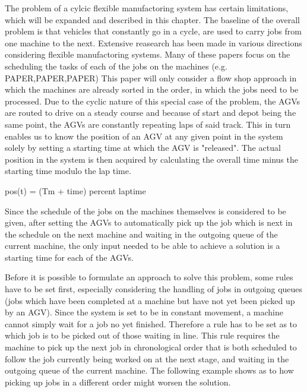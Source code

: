 
The problem of a cylcic flexible manufactoring system has certain limitations, which will be expanded and described in this chapter. The baseline
of the overall problem is that vehicles that constantly go in a cycle, are used to carry jobs from one machine to the next. Extensive reasearch 
has been made in various directions considering flexible manufactoring systems. Many of these papers focus on the scheduling the tasks of each of
the jobs on the machines (e.g. PAPER,PAPER,PAPER)
This paper will only consider
a flow shop approach in which the machines are already sorted in the order, in which the jobs need to be processed. Due to the cyclic nature of
this special case of the problem, the AGVs are routed to drive on a steady course and because of start and depot being the same point, the AGVs
are constantly repeating laps of said track. This in turn enables us to know the position of an AGV at any given point in the system solely by
setting a starting time at which the AGV is "released". The actual position in the system is then acquired by calculating the overall time minus
the starting time modulo the lap time.

pos(t) = (Tm + time) percent laptime

Since the schedule of the jobs on the machines themselves is considered to be given, after setting the AGVs to automatically pick up the job 
which is next in the schedule on the next machine and waiting in the outgoing queue of the current machine, the only input needed to be able
to achieve a solution is a starting time for each of the AGVs.

Before it is possible to formulate an approach to solve this problem, some rules have to be set first, especially considering the handling of
jobs in outgoing queues (jobs which have been completed at a machine but have not yet been picked up by an AGV). Since the system is set to be
in constant movement, a machine cannot simply wait for a job no yet finished. Therefore a rule has to be set as to which job is to be picked out
of those waiting in line. This rule requires the machine to pick up the next job in chronological order that is both scheduled to follow the job
currently being worked on at the next stage, and waiting in the outgoing queue of the current machine. The following example shows as to how
picking up jobs in a different order might worsen the solution.

